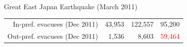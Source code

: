 \documentclass[serif, aspectratio=169]{beamer}
\begin{document}
\begin{frame}{Great East Japan Earthquake (March 2011)}
\begin{minipage}{1.00\textwidth}
\begin{flushleft}
\begin{table}[h!]
\begin{minipage}[c]{0.51\textwidth}
{\begin{tabular}{|r|c|c|c|}
    In-pref. evacuees (Dec 2011) & \multicolumn{1}{r|}{43,953} & \multicolumn{1}{r|}{122,557} & \multicolumn{1}{r|}{95,200} \\
    Out-pref. evacuees (Dec 2011) & \multicolumn{1}{r|}{1,536} & \multicolumn{1}{r|}{8,603} & \multicolumn{1}{r|}{\textcolor{red}{59,464}} \\
    \hline
    \end{tabular}
    }
\end{minipage}


  \vspace{-1.6cm}
\end{table}
\end{flushleft}
    \end{minipage}
    
\end{frame}
\end{document}
